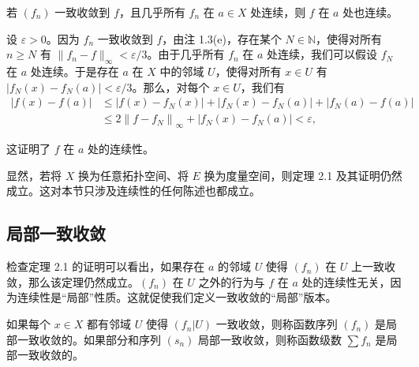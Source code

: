 \begin{theorem}

若 $ (f_n) $ 一致收敛到 $ f $，且几乎所有 $ f_n $ 在 $ a \in X $ 处连续，则 $ f $ 在 $ a $ 处也连续。

\proofhead
设 $ \varepsilon > 0 $。因为 $ f_n $ 一致收敛到 $ f $，由注 1.3(e)，存在某个 $ N \in \mathbb{N} $，使得对所有 $ n \geq N $ 有 $ \|f_n - f\|_\infty < \varepsilon/3 $。由于几乎所有 $ f_n $ 在 $ a $ 处连续，我们可以假设 $ f_N $ 在 $ a $ 处连续。于是存在 $ a $ 在 $ X $ 中的邻域 $ U $，使得对所有 $ x \in U $ 有 $ |f_N(x) - f_N(a)| < \varepsilon/3 $。那么，对每个 $ x \in U $，我们有
\begin{equation*}
\begin{aligned}
\left|f(x)-f(a)\right|&\leq\left|f(x)-f_{N}(x)\right|+\left|f_{N}(x)-f_{N}(a)\right|+\left|f_{N}(a)-f(a)\right|\\&\leq2\left\|f-f_{N}\right\|_{\infty}+\left|f_{N}(x)-f_{N}(a)\right|<\varepsilon,
\end{aligned}
\end{equation*}

这证明了 $ f $ 在 $ a $ 处的连续性。

\end{theorem}

\begin{remark}

显然，若将 $ X $ 换为任意拓扑空间、将 $ E $ 换为度量空间，则定理 2.1 及其证明仍然成立。这对本节只涉及连续性的任何陈述也都成立。

\end{remark}

\subsection*{局部一致收敛}

检查定理 2.1 的证明可以看出，如果存在 $a$ 的邻域 $U$ 使得 $(f_n)$ 在 $U$ 上一致收敛，那么该定理仍然成立。$(f_n)$ 在 $U$ 之外的行为与 $f$ 在 $a$ 处的连续性无关，因为连续性是“局部”性质。这就促使我们定义一致收敛的“局部”版本。

如果每个 $x \in X$ 都有邻域 $U$ 使得 $(f_n|U)$ 一致收敛，则称函数序列 $(f_n)$ 是局部一致收敛的。如果部分和序列 $(s_n)$ 局部一致收敛，则称函数级数 $\sum f_n$ 是局部一致收敛的。

